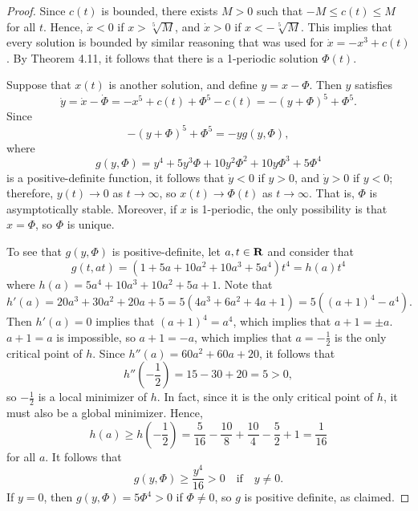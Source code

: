 \documentclass[nonumber]{homework}
\begin{document}
	\begin{proof}
		Since $c(t)$ is bounded, there exists $M > 0$ such that $-M \le c(t) \le M$ for all $t$. Hence, $\dot{x} < 0$ if $x > \sqrt[5]{M}$, and $\dot{x} > 0$ if $x < -\sqrt[5]{M}$. This implies that every solution is bounded by similar reasoning that was used for $\dot{x} = -x^3 + c(t)$. By Theorem 4.11, it follows that there is a 1-periodic solution $\Phi(t)$.
		
		Suppose that $x(t)$ is another solution, and define $y = x - \Phi$. Then $y$ satisfies
		\begin{equation*}
			\dot{y} = \dot{x} - \dot{\Phi} = -x^5 + c(t) + \Phi^5 - c(t) = -(y+\Phi)^5 + \Phi^5.
		\end{equation*}
		Since
		\begin{equation*}
			-(y+\Phi)^5 + \Phi^5 = -yg(y,\Phi),
		\end{equation*}
		where
		\begin{equation*}
			g(y,\Phi) = y^4 + 5y^3\Phi + 10y^2\Phi^2 + 10y\Phi^3 + 5\Phi^4
		\end{equation*}
		is a positive-definite function, it follows that $\dot{y} < 0$ if $y > 0$, and $\dot{y} > 0$ if $y< 0$; therefore, $y(t)\to 0$ as $t\to \infty$, so $x(t) \to \Phi(t)$ as $t \to \infty$. That is, $\Phi$ is asymptotically stable. Moreover, if $x$ is 1-periodic, the only possibility is that $x = \Phi$, so $\Phi$ is unique.
		
		To see that $g(y,\Phi)$ is positive-definite, let $a,t \in \textnormal{\bf R}$ and consider that
		\begin{equation*}
			g(t,at) = (1 + 5a + 10a^2 + 10a^3 + 5a^4)t^4 = h(a)t^4
		\end{equation*}
		where $h(a) = 5a^4 + 10a^3 + 10a^2 + 5a+1$. Note that
		\begin{equation*}
			h'(a) = 20a^3 + 30a^2 + 20a + 5 = 5(4a^3 + 6 a^2 + 4a + 1) =5\left((a+1)^4 - a^4\right).
		\end{equation*}
		Then $h'(a) = 0$ implies that $(a+1)^4 = a^4$, which implies that $a + 1 = \pm a$. $a + 1 = a$ is impossible, so $a + 1 = -a$, which implies that $a = -\frac{1}{2}$ is the only critical point of $h$. Since $h''(a) = 60a^2 + 60a + 20$, it follows that
		\begin{equation*}
			h''\left(-\frac{1}{2}\right) = 15 - 30 + 20 = 5 > 0,
		\end{equation*}
		so $-\frac{1}{2}$ is a local minimizer of $h$. In fact, since it is the only critical point of $h$, it must also be a global minimizer. Hence,
		\begin{equation*}
			h(a) \ge h\left(-\frac{1}{2}\right) = \frac{5}{16} - \frac{10}{8} + \frac{10}{4} - \frac{5}{2} + 1 = \frac{1}{16}
		\end{equation*}
		for all $a$. It follows that
		\begin{equation*}
			g(y,\Phi) \ge \frac{y^4}{16} > 0 \quad \text{if}\quad y \ne 0.
		\end{equation*}
		If $y = 0$, then $g(y,\Phi) = 5\Phi^4 > 0$ if $\Phi \ne 0$, so $g$ is positive definite, as claimed.
	\end{proof}
\end{document}
